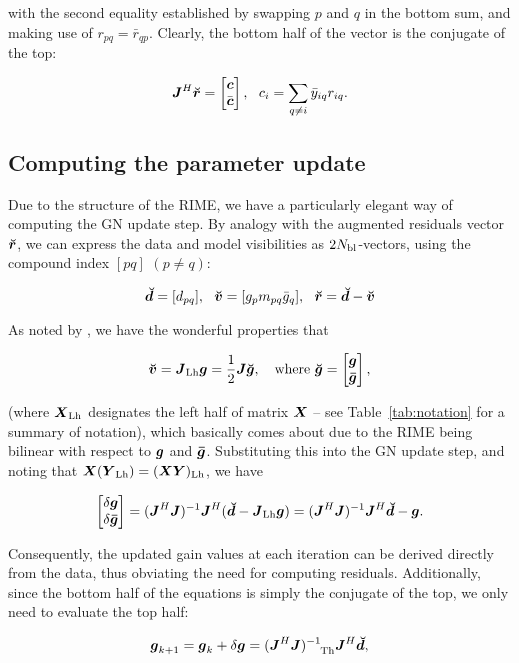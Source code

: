 \documentclass[useAMS,usenatbib]{mn2e}
\newcommand{\vecg}{\bmath{g}}
\newcommand{\vecgc}{\bmath{\bar g}}
\newcommand{\mat}[1]{{\bmath{#1}}}
\newcommand{\JJ}{\mat{J}} %
\newcommand{\JHJ}{\JJ^H\JJ} %
\begin{document}
with the second equality established by swapping $p$ and $q$ in the bottom sum, and making use of $r_{pq}=\bar{r}_{qp}$. Clearly, the bottom half of the vector is the conjugate of the top:

\begin{equation}
\label{eq:JHR:DI1}
\JJ^H\Rr = \Matrix{c}{\bmath{c}\\\bar{\bmath{c}}},~~c_i = \sum\limits_{q\ne i} \bar{y}_{iq} r_{iq}.
\end{equation}


\subsection{Computing the parameter update}

Due to the structure of the RIME, we have a particularly elegant way of computing the GN update step.
By analogy with the augmented residuals vector $\Rr$, we can express the data and model visibilities as $2N_\mathrm{bl}$-vectors,
using the compound index $[pq]$ $(p\ne q)$:

\[
\Dd = [ d_{pq} ],~~\Vv = [ g_p m_{pq} \bar{g}_q ],~~\Rr =\Dd-\Vv
\]

As noted by \citet{tasse-cohjones}, we have the wonderful properties that

\begin{equation}
\label{eq:v_Jg}
\Vv = \JJ_\LEFT \bmath{g}  = \frac{1}{2}\JJ \Gg,~~~\mathrm{where}~\Gg = \Matrix{c}{\bmath{g} \\ \bmath{\bar g}},
\end{equation}

(where $\bmath{X}_\LEFT$ designates the left half of matrix $\bmath{X}$ -- see Table~\ref{tab:notation} for a summary of notation),
which basically comes about due to the RIME being bilinear with respect to $\bmath{g}$ and $\bmath{\bar g}$. 
Substituting this into the GN update step, and noting that $\bmath{X}(\bmath{Y}_\LEFT) = (\bmath{XY})_\LEFT$, 
we have 

\[
\Matrix{c}{\delta\vecg\\\delta\vecgc} = (\JHJ)^{-1} \JJ^H (\Dd - \JJ_\LEFT \vecg) = (\JHJ)^{-1} \JJ^H \Dd - \vecg.
\]

Consequently, the updated gain values at each iteration can be derived directly from the data, thus obviating the need
for computing residuals. Additionally, since the bottom half of the equations is simply the conjugate of the top, we only 
need to evaluate the top half:

\begin{equation}
\label{eq:ghat}
\vecg_{k+1} = \vecg_k + \delta\vecg = (\JHJ)^{-1}_{~~~\TOP} \JJ^H \Dd,
\end{equation}
\end{document}
